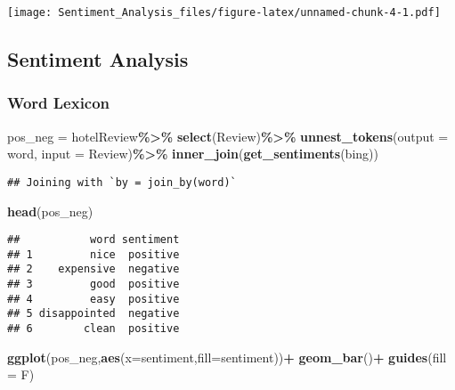 \documentclass[
]{article}
\newenvironment{Shaded}{\begin{snugshade}}{\end{snugshade}}
\newcommand{\AttributeTok}[1]{\textcolor[rgb]{0.13,0.29,0.53}{#1}}
\newcommand{\FunctionTok}[1]{\textcolor[rgb]{0.13,0.29,0.53}{\textbf{#1}}}
\newcommand{\NormalTok}[1]{#1}
\newcommand{\OtherTok}[1]{\textcolor[rgb]{0.56,0.35,0.01}{#1}}
\newcommand{\SpecialCharTok}[1]{\textcolor[rgb]{0.81,0.36,0.00}{\textbf{#1}}}
\newcommand{\StringTok}[1]{\textcolor[rgb]{0.31,0.60,0.02}{#1}}
\begin{document}
\texttt{[image: Sentiment\_Analysis\_files/figure-latex/unnamed-chunk-4-1.pdf]}

\hypertarget{sentiment-analysis}{%
\subsection{Sentiment Analysis}\label{sentiment-analysis}}

\hypertarget{word-lexicon}{%
\subsubsection{Word Lexicon}\label{word-lexicon}}

\begin{Shaded}
\begin{Highlighting}[]
\NormalTok{pos\_neg }\OtherTok{=}\NormalTok{ hotelReview}\SpecialCharTok{\%\textgreater{}\%}
            \FunctionTok{select}\NormalTok{(Review)}\SpecialCharTok{\%\textgreater{}\%}
            \FunctionTok{unnest\_tokens}\NormalTok{(}\AttributeTok{output =}\NormalTok{ word, }\AttributeTok{input =}\NormalTok{ Review)}\SpecialCharTok{\%\textgreater{}\%}
            \FunctionTok{inner\_join}\NormalTok{(}\FunctionTok{get\_sentiments}\NormalTok{(}\StringTok{\textquotesingle{}bing\textquotesingle{}}\NormalTok{))}
\end{Highlighting}
\end{Shaded}

\begin{verbatim}
## Joining with `by = join_by(word)`
\end{verbatim}

\begin{Shaded}
\begin{Highlighting}[]
\FunctionTok{head}\NormalTok{(pos\_neg)}
\end{Highlighting}
\end{Shaded}

\begin{verbatim}
##           word sentiment
## 1         nice  positive
## 2    expensive  negative
## 3         good  positive
## 4         easy  positive
## 5 disappointed  negative
## 6        clean  positive
\end{verbatim}

\begin{Shaded}
\begin{Highlighting}[]
\FunctionTok{ggplot}\NormalTok{(pos\_neg,}\FunctionTok{aes}\NormalTok{(}\AttributeTok{x=}\NormalTok{sentiment,}\AttributeTok{fill=}\NormalTok{sentiment))}\SpecialCharTok{+}
  \FunctionTok{geom\_bar}\NormalTok{()}\SpecialCharTok{+}
  \FunctionTok{guides}\NormalTok{(}\AttributeTok{fill =}\NormalTok{ F)}
\end{Highlighting}
\end{Shaded}
\end{document}
